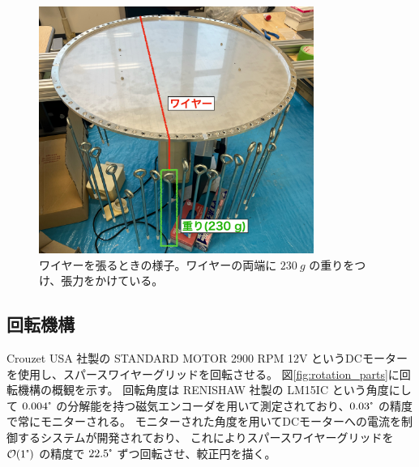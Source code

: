 \documentclass[../../main.tex]{subfiles}
\begin{document}
\begin{figure}[H]
    \centering
    \includegraphics[width=0.8\textwidth]{wiregrid/wire_attachment.pdf}
    \caption[ワイヤーを張るときの様子]{ワイヤーを張るときの様子。ワイヤーの両端に $\SI{230}{g}$ の重りをつけ、張力をかけている。}
    \label{fig:wire_attachment}
\end{figure}
\subsection{回転機構}
Crouzet USA 社製の STANDARD MOTOR 2900 RPM 12V というDCモーターを使用し、スパースワイヤーグリッドを回転させる。
図\ref{fig:rotation_parts}に回転機構の概観を示す。
回転角度は RENISHAW 社製の LM15IC という角度にして $0.004\tcdegree$ の分解能を持つ磁気エンコーダを用いて測定されており、$0.03\tcdegree$ の精度で常にモニターされる。
モニターされた角度を用いてDCモーターへの電流を制御するシステムが開発されており、
これによりスパースワイヤーグリッドを$\order{1\tcdegree}$ の精度で $22.5\tcdegree$ ずつ回転させ、較正円を描く\cite{swg:nakata}。
\end{document}
